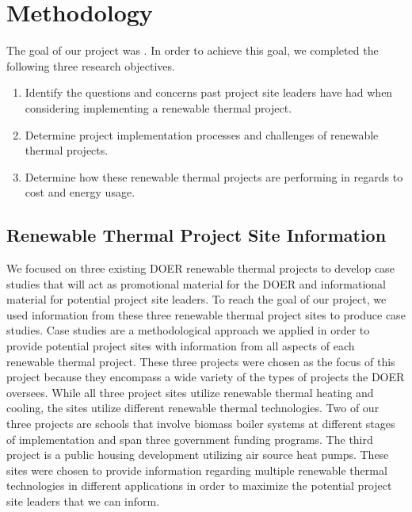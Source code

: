 
\chapter{Methodology}
\par The goal of our project was \goal. In order to achieve this goal, we completed the following three research objectives.
\begin{enumerate}
  \item{Identify the questions and concerns past project site leaders have had when considering implementing a renewable thermal project.}
  \item{Determine project implementation processes and challenges of renewable thermal projects.}
  \item{Determine how these renewable thermal projects are performing in regards to cost and energy usage.}
\end{enumerate}

  \section{Renewable Thermal Project Site Information}
  \par We focused on three existing DOER renewable thermal projects to develop case studies that will act as promotional material for the DOER and informational material for potential project site leaders. To reach the goal of our project, we used information from these three renewable thermal project sites to produce case studies. Case studies are a methodological approach we applied in order to provide potential project sites with information from all aspects of each renewable thermal project. These three projects were chosen as the focus of this project because they encompass a wide variety of the types of projects the DOER oversees. While all three project sites utilize renewable thermal heating and cooling, the sites utilize different renewable thermal technologies. Two of our three projects are schools that involve biomass boiler systems at different stages of implementation and span three government funding programs. The third project is a public housing development utilizing air source heat pumps. These sites were chosen to provide information regarding multiple renewable thermal technologies in different applications  in order to maximize the potential project site leaders that we can inform.

